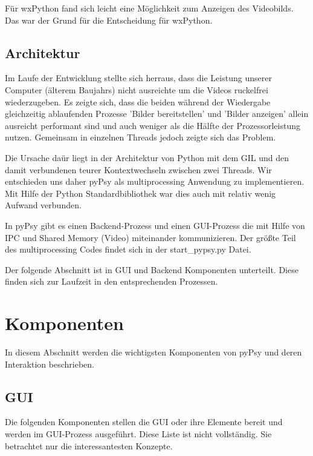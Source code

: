 \documentclass[a4paper,draft]{scrartcl}
\begin{document}
F\"ur wxPython fand sich leicht eine M\"oglichkeit zum Anzeigen des Videobilds.
Das war der Grund f\"ur die Entscheidung f\"ur wxPython.

\subsection{Architektur}
Im Laufe der Entwicklung stellte sich herraus, dass die Leistung unserer Computer (\"alterem Baujahrs) nicht ausreichte um die Videos ruckelfrei wiederzugeben.
Es zeigte sich, dass die beiden w\"ahrend der Wiedergabe gleichzeitig ablaufenden Prozesse 'Bilder bereitstellen' und 'Bilder anzeigen' allein ausreicht performant sind und auch weniger als die H\"alfte der Prozessorleistung nutzen.
Gemeinsam in einzelnen Threads jedoch zeigte sich das Problem.

Die Ursache da\"ur liegt in der Architektur von Python mit dem GIL und den damit verbundenen teurer Kontextwechseln zwischen zwei Threads.
Wir entschieden uns daher pyPsy als multiprocessing Anwendung zu implementieren.
Mit Hilfe der Python Standardbibliothek war dies auch mit relativ wenig Aufwand verbunden.

In pyPsy gibt es einen Backend-Prozess und einen GUI-Prozess die mit Hilfe von IPC und Shared Memory (Video) miteinander kommunizieren.
Der gr\"o\ss te Teil des multiprocessing Codes findet sich in der start\_pypsy.py Datei.

Der folgende Abschnitt ist in GUI und Backend Komponenten unterteilt.
Diese finden sich zur Laufzeit in den entsprechenden Prozessen.

\section{Komponenten}
In diesem Abschnitt werden die wichtigsten Komponenten von pyPsy und deren Interaktion beschrieben.

\subsection{GUI}
Die folgenden Komponenten stellen die GUI oder ihre Elemente bereit und werden im GUI-Prozess ausgef\"uhrt.
Diese Liste ist nicht vollst\"andig.
Sie betrachtet nur die interessantesten Konzepte.
\end{document}

